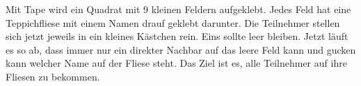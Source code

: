 Mit Tape wird ein Quadrat mit 9 kleinen Feldern aufgeklebt. Jedes Feld hat eine Teppichfliese mit einem Namen drauf geklebt darunter. Die Teilnehmer stellen 
sich jetzt jeweils in ein kleines Kästchen rein. Eins sollte leer bleiben. Jetzt läuft es so ab, dass immer nur ein direkter Nachbar auf das leere Feld kann und gucken kann welcher Name auf der Fliese steht. Das Ziel ist es, alle Teilnehmer auf ihre Fliesen zu bekommen.